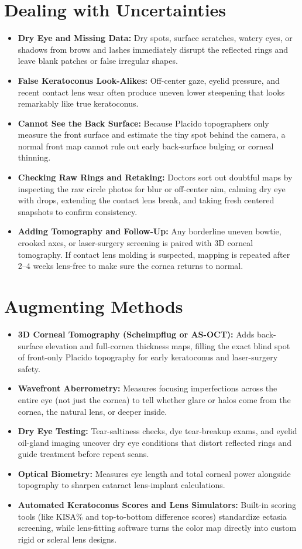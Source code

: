 \section{Dealing with Uncertainties}
\begin{itemize}
    \item \textbf{Dry Eye and Missing Data:} Dry spots, surface scratches, watery eyes, or shadows from brows and lashes immediately disrupt the reflected rings and leave blank patches or false irregular shapes.
    \item \textbf{False Keratoconus Look-Alikes:} Off-center gaze, eyelid pressure, and recent contact lens wear often produce uneven lower steepening that looks remarkably like true keratoconus.
    \item \textbf{Cannot See the Back Surface:} Because Placido topographers only measure the front surface and estimate the tiny spot behind the camera, a normal front map cannot rule out early back-surface bulging or corneal thinning.
    \item \textbf{Checking Raw Rings and Retaking:} Doctors sort out doubtful maps by inspecting the raw circle photos for blur or off-center aim, calming dry eye with drops, extending the contact lens break, and taking fresh centered snapshots to confirm consistency.
    \item \textbf{Adding Tomography and Follow-Up:} Any borderline uneven bowtie, crooked axes, or laser-surgery screening is paired with 3D corneal tomography. If contact lens molding is suspected, mapping is repeated after 2--4 weeks lens-free to make sure the cornea returns to normal.
\end{itemize}

\section{Augmenting Methods}
\begin{itemize}
    \item \textbf{3D Corneal Tomography (Scheimpflug or AS-OCT):} Adds back-surface elevation and full-cornea thickness maps, filling the exact blind spot of front-only Placido topography for early keratoconus and laser-surgery safety.
    \item \textbf{Wavefront Aberrometry:} Measures focusing imperfections across the entire eye (not just the cornea) to tell whether glare or halos come from the cornea, the natural lens, or deeper inside.
    \item \textbf{Dry Eye Testing:} Tear-saltiness checks, dye tear-breakup exams, and eyelid oil-gland imaging uncover dry eye conditions that distort reflected rings and guide treatment before repeat scans.
    \item \textbf{Optical Biometry:} Measures eye length and total corneal power alongside topography to sharpen cataract lens-implant calculations.
    \item \textbf{Automated Keratoconus Scores and Lens Simulators:} Built-in scoring tools (like KISA\% and top-to-bottom difference scores) standardize ectasia screening, while lens-fitting software turns the color map directly into custom rigid or scleral lens designs.
\end{itemize}


